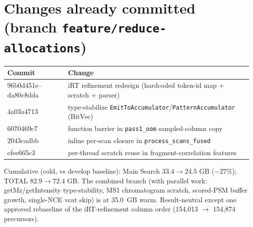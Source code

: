 \documentclass[11pt]{article}
\begin{document}
\section{Changes already committed (branch \texttt{feature/reduce-allocations})}
\begin{center}
\begin{tabular}{ll}
\toprule
Commit & Change \\
\midrule
96b0d451e--da80c8dda & iRT refinement redesign (hardcoded token-id map + scratch + parser) \\
4a03a4713 & type-stabilize \texttt{EmitToAccumulator}/\texttt{PatternAccumulator} (BitVec) \\
6070469c7 & function barrier in \texttt{pass1\_oom} sampled-column copy \\
2043cadbb & inline per-scan closure in \texttt{process\_scans\_fused} \\
cfee665c3 & per-thread scratch reuse in fragment-correlation features \\
\bottomrule
\end{tabular}
\end{center}
Cumulative (cold, vs develop baseline): Main Search $33.4\to24.5$ GB ($-27\%$);
TOTAL $82.9\to72.4$ GB. The combined branch (with parallel work: getMz/getIntensity
type-stability, MS1 chromatogram scratch, scored-PSM buffer growth, single-NCE vcat
skip) is at \SI{35.0}{GB} warm. Result-neutral except one approved rebaseline of the
iRT-refinement column order (154{,}013 $\to$ 154{,}874 precursors).
\end{document}
